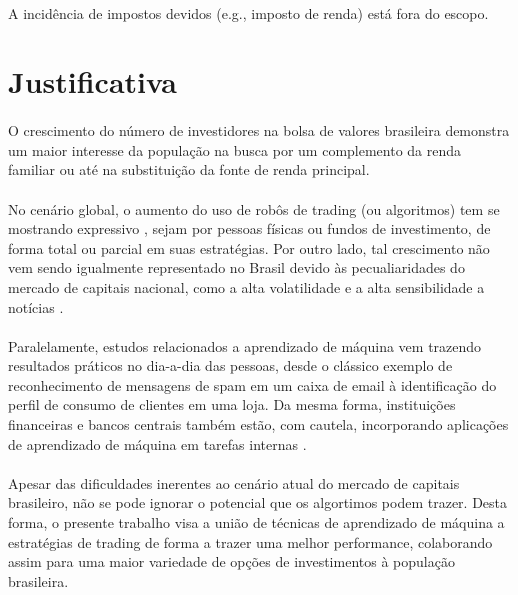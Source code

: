 \paragraph{} A incidência de impostos devidos (e.g., imposto de renda) está fora do escopo.

\section{Justificativa}

\paragraph{} O crescimento do número de investidores na bolsa de valores brasileira \cite{aumento_investidores} demonstra um maior interesse da população na busca por um complemento da renda familiar ou até na substituição da fonte de renda principal.

\paragraph{} No cenário global, o aumento do uso de robôs de trading (ou algoritmos) tem se mostrando expressivo \cite{robos_investidores}, sejam por pessoas físicas ou fundos de investimento, de forma total ou parcial em suas estratégias. Por outro lado, tal crescimento não vem sendo igualmente representado no Brasil devido às pecualiaridades do mercado de capitais nacional, como a alta volatilidade e a alta sensibilidade a notícias \cite{robos_e_fundos}.

\paragraph{} Paralelamente, estudos relacionados a aprendizado de máquina vem trazendo resultados práticos no dia-a-dia das pessoas, desde o clássico exemplo de reconhecimento de mensagens de spam em um caixa de email à identificação do perfil de consumo de clientes em uma loja. Da mesma forma, instituições financeiras e bancos centrais também estão, com cautela, incorporando aplicações de aprendizado de máquina em tarefas internas \cite{fernandez2019artificial}.

\paragraph{} Apesar das dificuldades inerentes ao cenário atual do mercado de capitais brasileiro, não se pode ignorar o potencial que os algortimos podem trazer. Desta forma, o presente trabalho visa a união de técnicas de aprendizado de máquina a estratégias de trading de forma a trazer uma melhor performance, colaborando assim para uma maior variedade de opções de investimentos à população brasileira.

